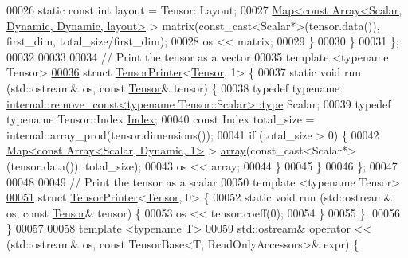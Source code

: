 \begin{DoxyCode}
00026       \textcolor{keyword}{static} \textcolor{keyword}{const} \textcolor{keywordtype}{int} layout = Tensor::Layout;
00027       \hyperlink{group___core___module_class_eigen_1_1_map}{Map<const Array<Scalar, Dynamic, Dynamic, layout>} > 
      matrix(const\_cast<Scalar*>(tensor.data()), first\_dim, total\_size/first\_dim);
00028       os << matrix;
00029     \}
00030   \}
00031 \};
00032 
00033 
00034 \textcolor{comment}{// Print the tensor as a vector}
00035 \textcolor{keyword}{template} <\textcolor{keyword}{typename} Tensor>
\hyperlink{struct_eigen_1_1internal_1_1_tensor_printer_3_01_tensor_00_011_01_4}{00036} \textcolor{keyword}{struct }\hyperlink{struct_eigen_1_1internal_1_1_tensor_printer}{TensorPrinter}<\hyperlink{class_eigen_1_1_tensor}{Tensor}, 1> \{
00037   \textcolor{keyword}{static} \textcolor{keywordtype}{void} run (std::ostream& os, \textcolor{keyword}{const} \hyperlink{class_eigen_1_1_tensor}{Tensor}& tensor) \{
00038     \textcolor{keyword}{typedef} \textcolor{keyword}{typename} \hyperlink{group___sparse_core___module}{internal::remove\_const<typename Tensor::Scalar>::type}
       Scalar;
00039     \textcolor{keyword}{typedef} \textcolor{keyword}{typename} Tensor::Index \hyperlink{namespace_eigen_a62e77e0933482dafde8fe197d9a2cfde}{Index};
00040     \textcolor{keyword}{const} Index total\_size = internal::array\_prod(tensor.dimensions());
00041     \textcolor{keywordflow}{if} (total\_size > 0) \{
00042       \hyperlink{group___core___module_class_eigen_1_1_map}{Map<const Array<Scalar, Dynamic, 1>} > 
      \hyperlink{class_eigen_1_1array}{array}(const\_cast<Scalar*>(tensor.data()), total\_size);
00043       os << array;
00044     \}
00045   \}
00046 \};
00047 
00048 
00049 \textcolor{comment}{// Print the tensor as a scalar}
00050 \textcolor{keyword}{template} <\textcolor{keyword}{typename} Tensor>
\hyperlink{struct_eigen_1_1internal_1_1_tensor_printer_3_01_tensor_00_010_01_4}{00051} \textcolor{keyword}{struct }\hyperlink{struct_eigen_1_1internal_1_1_tensor_printer}{TensorPrinter}<\hyperlink{class_eigen_1_1_tensor}{Tensor}, 0> \{
00052   \textcolor{keyword}{static} \textcolor{keywordtype}{void} run (std::ostream& os, \textcolor{keyword}{const} \hyperlink{class_eigen_1_1_tensor}{Tensor}& tensor) \{
00053     os << tensor.coeff(0);
00054   \}
00055 \};
00056 \}
00057 
00058 \textcolor{keyword}{template} <\textcolor{keyword}{typename} T>
00059 std::ostream& operator << (std::ostream& os, const TensorBase<T, ReadOnlyAccessors>& expr) \{

\end{DoxyCode}
